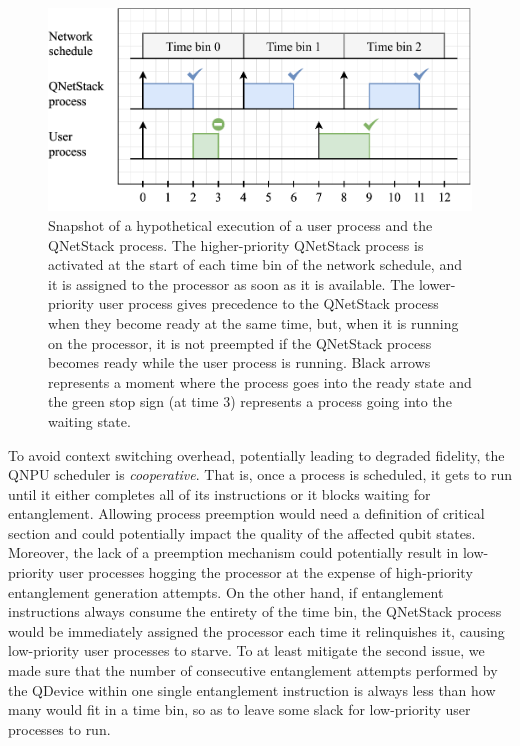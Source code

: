 \begin{figure}
\begin{center}
\includegraphics[width=\linewidth]{figures/qnodeos/supplementary/scheduling-impl.pdf}
\end{center}
\caption[]{Snapshot of a hypothetical execution of a user process and the \ac{QNetStack} process. The higher-priority \ac{QNetStack} process is activated at the start of each time bin of the network schedule, and it is assigned to the processor as soon as it is available. The lower-priority user process gives precedence to the \ac{QNetStack} process when they become ready at the same time, but, when it is running on the processor, it is not preempted if the \ac{QNetStack} process becomes ready while the user process is running. Black arrows represents a moment where the process goes into the ready state and the green stop sign (at time $3$) represents a process going into the waiting state.}
\label{qnodeos:fig:scheduling-impl}
\end{figure}

To avoid context switching overhead, potentially leading to degraded fidelity, the \ac{QNPU} scheduler is \emph{cooperative}. That is, once a process is scheduled, it gets to run until it either completes all of its instructions or it blocks waiting for entanglement. Allowing process preemption would need a definition of critical section and could potentially impact the quality of the affected qubit states. Moreover, the lack of a preemption mechanism could potentially result in low-priority user processes hogging the processor at the expense of high-priority entanglement generation attempts. On the other hand, if entanglement instructions always consume the entirety of the time bin, the \ac{QNetStack} process would be immediately assigned the processor each time it relinquishes it, causing low-priority user processes to starve. To at least mitigate the second issue, we made sure that the number of consecutive entanglement attempts performed by the \ac{QDevice} within one single entanglement instruction is always less than how many would fit in a time bin, so as to leave some slack for low-priority user processes to run.


